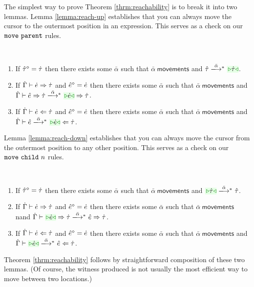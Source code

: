 The simplest way to prove Theorem \ref{thrm:reachability} is to break it
into two lemmas. Lemma \ref{lemma:reach-up} establishes that you can always
move the cursor to the outermost position in an expression. This serves as
a check on our $\mathtt{move}~\mathtt{parent}$ rules.
\begin{lemma}[Reach Up]\label{lemma:reach-up} ~
  \begin{enumerate}[itemsep=0px,partopsep=0px,topsep=0px]
  \item If $\hat{\tau}^{\diamond}=\dot{\tau}$ then there exists some $\bar\alpha$
    such that $\bar\alpha~\mathsf{movements}$ and
    $\performTypI{\ztau}{\bar\alpha}{\zwsel{\htau}}$.

  \item If $\dot{\Gamma} \vdash \dot{e} \Rightarrow \dot{\tau}$ and $\hat{e}^{\diamond}=\dot{e}$
    then there exists some $\bar\alpha$ such that
    $\bar\alpha~\mathsf{movements}$ and
    $\performSynI{\hGamma}{\zexp}{\htau}{\bar\alpha}{\zwsel{\hexp}}{\htau}$.

  \item If $\dot{\Gamma} \vdash \dot{e} \Leftarrow \dot{\tau}$ and $\hat{e}^{\diamond}=\dot{e}$
    then there exists some $\bar\alpha$ such that
    $\bar\alpha~\mathsf{movements}$ and
    $\performAnaI{\hGamma}{\zexp}{\htau}{\bar\alpha}{\zwsel{\hexp}}$.
  \end{enumerate}
\end{lemma}
Lemma \ref{lemma:reach-down} establishes that you can always move the
cursor from the outermost position to any other position. This serves as a
check on our $\mathtt{move}~\mathtt{child}~{n}$ rules.
\begin{lemma}\label{lemma:reach-down} ~
  \begin{enumerate}[itemsep=0px,partopsep=0px,topsep=0px]
  \item If $\hat{\tau}^{\diamond}=\dot{\tau}$ then there exists some $\bar\alpha$
    such that $\bar\alpha~\mathsf{movements}$ and
    $\performTypI{\zwsel{\htau}}{\bar\alpha}{\ztau}$.

  \item If $\dot{\Gamma} \vdash \dot{e} \Rightarrow \dot{\tau}$ and $\hat{e}^{\diamond}=\dot{e}$
    then there exists some $\bar\alpha$ such that
    $\bar\alpha~\mathsf{movements}$ nand
    $\performSynI{\hGamma}{\zwsel{\hexp}}{\htau}{\bar\alpha}{\zexp}{\htau}$.

  \item If $\dot{\Gamma} \vdash \dot{e} \Leftarrow \dot{\tau}$ and $\hat{e}^{\diamond}=\dot{e}$
    then there exists some $\bar\alpha$ such that
    $\bar\alpha~\mathsf{movements}$ and
    $\performAnaI{\hGamma}{\zwsel{\hexp}}{\htau}{\bar\alpha}{\zexp}$.
  \end{enumerate}
\end{lemma}
Theorem \ref{thrm:reachability} follows by straightforward composition of
these two lemmas. (Of course, the witness produced is not usually the most efficient way
to move between two locations.)


